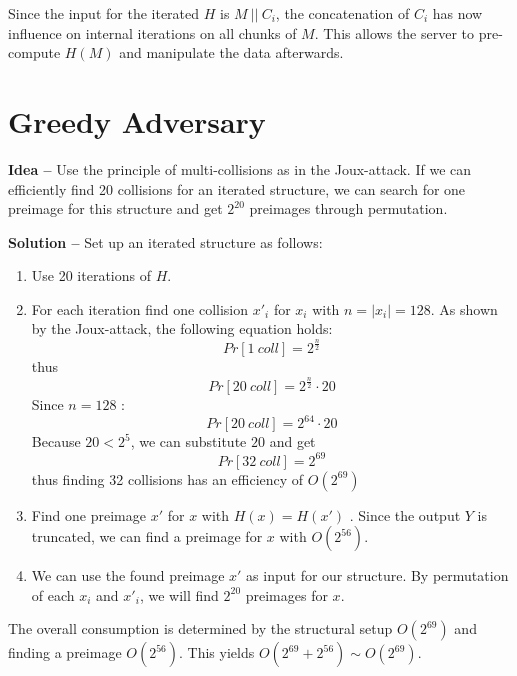 Since the input for the iterated $ H $ is $ M\ ||\ C_{i} $, the concatenation of $ C_{i} $ has now influence on internal iterations on all chunks of $ M $. This allows the server to pre-compute $ H(M) $ and manipulate the data afterwards.

\newpage
\section{Greedy Adversary}

\textbf{Idea --} Use the principle of multi-collisions as in the Joux-attack. If we can efficiently find 20 collisions for an iterated structure, we can search for one preimage for this structure and get $ 2^{20} $ preimages through permutation.

\textbf{Solution --} Set up an iterated structure as follows:

\begin{enumerate}
\item Use 20 iterations of $ H $.
\item For each iteration find one collision $ x'_{i} $ for $ x_{i} $ with $ n = |x_{i}| = 128 $. As shown by the Joux-attack, the following equation holds:
$$
Pr[1\ coll] = 2^{\frac{n}{2}}
$$ thus
$$
Pr[20\ coll] = 2^{\frac{n}{2}} \cdot 20
$$
Since $ n = 128 $ :
$$
Pr[20\ coll] = 2^{64} \cdot 20
$$
Because $ 20 < 2^{5} $, we can substitute $ 20 $ and get
$$
Pr[32\ coll] = 2^{69}
$$
thus finding 32 collisions has an efficiency of $ O(2^{69}) $
\item Find one preimage $ x' $ for $ x $ with $ H(x) = H(x') $ . Since the output $ Y $ is truncated, we can find a preimage for $ x $ with $ O(2^{56}) $.
\item We can use the found preimage $ x' $ as input for our structure. By permutation of each $ x_{i} $ and $ x'_{i} $, we will find $ 2^{20} $ preimages for $ x $.

\end{enumerate}

The overall consumption is determined by the structural setup $ O(2^{69}) $ and finding a preimage $ O( 2^{56} ) $. This yields $ O(2^{69} + 2^{56}) \sim O(2^{69} ) $.


